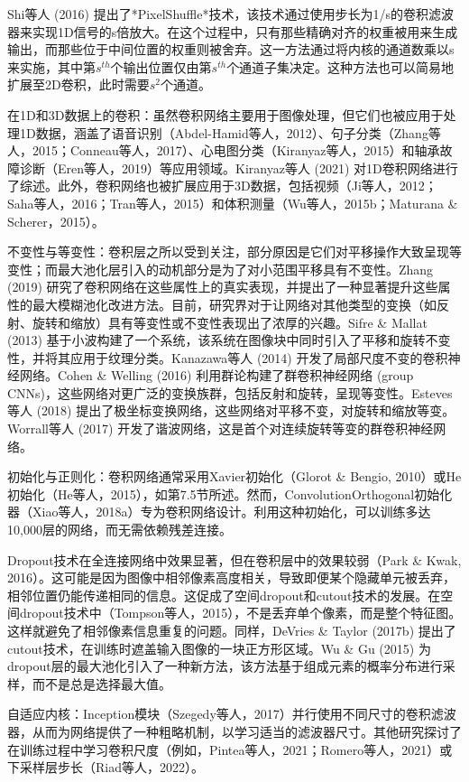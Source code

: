 \documentclass[lang=cn,newtx,10pt,scheme=chinese]{elegantbook}
\begin{document}
Shi等人 (2016) 提出了*PixelShuffle*技术，该技术通过使用步长为1/s的卷积滤波器来实现1D信号的s倍放大。在这个过程中，只有那些精确对齐的权重被用来生成输出，而那些位于中间位置的权重则被舍弃。这一方法通过将内核的通道数乘以s来实施，其中第\(s^{th}\)个输出位置仅由第\(s^{th}\)个通道子集决定。这种方法也可以简易地扩展至2D卷积，此时需要\(s^2\)个通道。

在1D和3D数据上的卷积：虽然卷积网络主要用于图像处理，但它们也被应用于处理1D数据，涵盖了语音识别（Abdel-Hamid等人，2012）、句子分类（Zhang等人，2015；Conneau等人，2017）、心电图分类（Kiranyaz等人，2015）和轴承故障诊断（Eren等人，2019）等应用领域。Kiranyaz等人 (2021) 对1D卷积网络进行了综述。此外，卷积网络也被扩展应用于3D数据，包括视频（Ji等人，2012；Saha等人，2016；Tran等人，2015）和体积测量（Wu等人，2015b；Maturana \& Scherer，2015）。

不变性与等变性：卷积层之所以受到关注，部分原因是它们对平移操作大致呈现等变性；而最大池化层引入的动机部分是为了对小范围平移具有不变性。Zhang (2019) 研究了卷积网络在这些属性上的真实表现，并提出了一种显著提升这些属性的最大模糊池化改进方法。目前，研究界对于让网络对其他类型的变换（如反射、旋转和缩放）具有等变性或不变性表现出了浓厚的兴趣。Sifre \& Mallat (2013) 基于小波构建了一个系统，该系统在图像块中同时引入了平移和旋转不变性，并将其应用于纹理分类。Kanazawa等人 (2014) 开发了局部尺度不变的卷积神经网络。Cohen \& Welling (2016) 利用群论构建了群卷积神经网络 (group CNNs)，这些网络对更广泛的变换族群，包括反射和旋转，呈现等变性。Esteves等人 (2018) 提出了极坐标变换网络，这些网络对平移不变，对旋转和缩放等变。Worrall等人 (2017) 开发了谐波网络，这是首个对连续旋转等变的群卷积神经网络。

初始化与正则化：卷积网络通常采用Xavier初始化（Glorot \& Bengio, 2010）或He初始化（He等人，2015），如第7.5节所述。然而，ConvolutionOrthogonal初始化器（Xiao等人，2018a）专为卷积网络设计。利用这种初始化，可以训练多达10,000层的网络，而无需依赖残差连接。

Dropout技术在全连接网络中效果显著，但在卷积层中的效果较弱（Park \& Kwak, 2016）。这可能是因为图像中相邻像素高度相关，导致即便某个隐藏单元被丢弃，相邻位置仍能传递相同的信息。这促成了空间dropout和cutout技术的发展。在空间dropout技术中（Tompson等人，2015），不是丢弃单个像素，而是整个特征图。这样就避免了相邻像素信息重复的问题。同样，DeVries \& Taylor (2017b) 提出了cutout技术，在训练时遮盖输入图像的一块正方形区域。Wu \& Gu (2015) 为dropout层的最大池化引入了一种新方法，该方法基于组成元素的概率分布进行采样，而不是总是选择最大值。

自适应内核：Inception模块（Szegedy等人，2017）并行使用不同尺寸的卷积滤波器，从而为网络提供了一种粗略机制，以学习适当的滤波器尺寸。其他研究探讨了在训练过程中学习卷积尺度（例如，Pintea等人，2021；Romero等人，2021）或下采样层步长（Riad等人，2022）。
\end{document}
